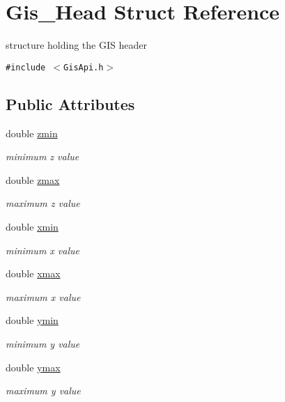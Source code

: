 \hypertarget{structGis__Head}{
\section{Gis\_\-Head Struct Reference}
\label{structGis__Head}
}
structure holding the GIS header  


{\tt \#include $<$Gis\-Api.h$>$}

\subsection*{Public Attributes}
\begin{CompactItemize}
\item 
double \hyperlink{structGis__Head_o0}{zmin}
\begin{CompactList}\small\item\em minimum z value \item\end{CompactList}\item 
double \hyperlink{structGis__Head_o1}{zmax}
\begin{CompactList}\small\item\em maximum z value \item\end{CompactList}\item 
double \hyperlink{structGis__Head_o2}{xmin}
\begin{CompactList}\small\item\em minimum x value \item\end{CompactList}\item 
double \hyperlink{structGis__Head_o3}{xmax}
\begin{CompactList}\small\item\em maximum x value \item\end{CompactList}\item 
double \hyperlink{structGis__Head_o4}{ymin}
\begin{CompactList}\small\item\em minimum y value \item\end{CompactList}\item 
double \hyperlink{structGis__Head_o5}{ymax}
\begin{CompactList}\small\item\em maximum y value \item\end{CompactList}\item 

\end{CompactItemize}
